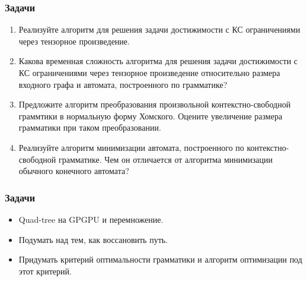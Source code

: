 \documentclass[xcolor=table]{beamer}
\begin{document}
\begin{frame} \frametitle{Задачи}

\begin{enumerate}
\item Реализуйте алгоритм для решения задачи достижимости с КС ограничениями через тензорное произведение.
\item Какова временная сложность алгоритма для решения задачи достижимости с КС ограничениями через тензорное произведение относительно размера входного графа и автомата, построенного по грамматике? 
\item Предложите алгоритм преобразования произвольной контекстно-свободной граммтики в нормальную форму Хомского. Оцените увеличение размера грамматики при таком преобразовании.
\item Реализуйте алгоритм минимизации автомата, построенного по контекстно-свободной грамматике. Чем он отличается от алгоритма минимизации обычного конечного автомата?
\end{enumerate}

\end{frame}


\begin{frame} \frametitle{Задачи}

\begin{itemize}
\item Quad-tree на GPGPU и перемножение.
\item Подумать над тем, как воссановить путь.
\item Придумать критерий оптимальности грамматики и алгоритм оптимизации под этот критерий.
\end{itemize}

\end{frame}
\end{document}
